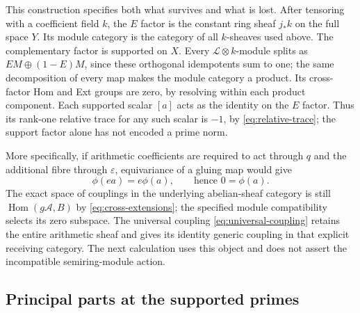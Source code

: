 \documentclass[11pt,a4paper]{article}
\theoremstyle{definition}\newtheorem{definition}[theorem]{Definition}
\providecommand{\Hom}{\operatorname{Hom}}
\begin{document}
This construction specifies both what survives and what is lost.
After tensoring with a coefficient field $k$, the $E$ factor is the
constant ring sheaf $j_*k$ on the full space $Y$. Its module category
is the category of all $k$-sheaves used above. The complementary
factor is supported on $X$. Every $\mathcal L\otimes k$-module splits
as $EM\oplus(1-E)M$, since these orthogonal idempotents sum to one;
the same decomposition of every map makes the module category a
product. Its cross-factor Hom and Ext groups are zero, by resolving
within each product component. Each supported scalar $[a]$ acts as
the identity on the $E$ factor. Thus its rank-one relative trace for
any such scalar is $-1$, by \eqref{eq:relative-trace}; the support
factor alone has not encoded a prime norm.

More specifically, if arithmetic coefficients are required to act
through $q$ and the additional fibre through $\varepsilon$, equivariance
of a gluing map would give
\[
 \phi(ea)=e\phi(a),\qquad\text{hence }0=\phi(a).
 \tag{RP20}\label{eq:coupling-obstruction}
\]
The exact space of couplings in the underlying abelian-sheaf category
is still $\Hom(g\mathcal A,B)$ by \eqref{eq:cross-extensions}; the
specified module compatibility selects its zero subspace. The universal
coupling \eqref{eq:universal-coupling} retains the entire arithmetic
sheaf and gives its identity generic coupling in that explicit receiving
category. The next calculation uses this object and does not assert
the incompatible semiring-module action.

\subsection{Principal parts at the supported primes}
\label{sec:principal-parts}
\end{document}
